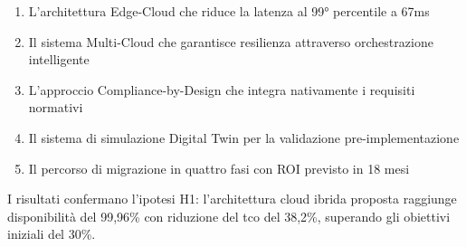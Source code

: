 \documentclass[12pt,a4paper,oneside]{book}
\begin{document}
\begin{enumerate}
    \item L'architettura Edge-Cloud che riduce la latenza al 99° percentile a 67ms
    \item Il sistema Multi-Cloud che garantisce resilienza attraverso orchestrazione intelligente
    \item L'approccio Compliance-by-Design che integra nativamente i requisiti normativi
    \item Il sistema di simulazione Digital Twin per la validazione pre-implementazione
    \item Il percorso di migrazione in quattro fasi con ROI previsto in 18 mesi
\end{enumerate}

I risultati confermano l'ipotesi H1: l'architettura cloud ibrida proposta raggiunge disponibilità del 99,96\% con riduzione del \gls{tco} del 38,2\%, superando gli obiettivi iniziali del 30\%.
\end{document}
